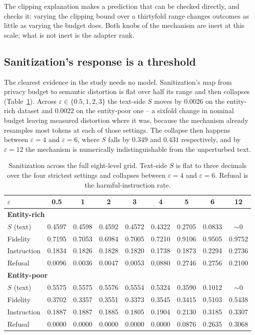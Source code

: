The clipping explanation makes a prediction that can be checked directly,
and  checks it:
varying the clipping bound over a thirtyfold range changes outcomes as little as varying the budget does.
Both knobs of the mechanism are inert at this scale;
what is not inert is the adapter rank.

\subsection{\label{apx:cliffdetail}Sanitization's response is a threshold}
The clearest evidence in the study needs no model.
Sanitization's map from privacy budget to semantic distortion is flat over half its range and then collapses (Table~\ref{tab:cliff}).
Across $\varepsilon \in \{0.5, 1, 2, 3\}$ the text-side $S$ moves by $0.0026$ on the entity-rich dataset and $0.0022$ on the entity-poor one -- a sixfold change in nominal budget leaving measured distortion where it was,
because the mechanism already resamples most tokens at each of those settings.
The collapse then happens between $\varepsilon = 4$ and $\varepsilon = 6$,
where $S$ falls by $0.349$ and $0.431$ respectively,
and by $\varepsilon = 12$ the mechanism is numerically indistinguishable from the unperturbed text.

\begin{table}[t]
  \centering
  \caption{Sanitization across the full eight-level grid.
  Text-side $S$ is flat to three decimals over the four strictest settings and collapses between $\varepsilon = 4$ and $\varepsilon = 6$. Refusal is the harmful-instruction rate.}
  \label{tab:cliff}
  \small
  \setlength{\tabcolsep}{4pt}
  \begin{tabular}{lcccccccc}
    \toprule
    $\varepsilon$ & 0.5 & 1 & 2 & 3 & 4 & 5 & 6 & 12 \\
    \midrule
    \multicolumn{9}{l}{\textbf{Entity-rich}} \\
    $S$ (text)            & 0.4597 & 0.4598 & 0.4592 & 0.4572 & 0.4322 & 0.2705 & 0.0833 & $\sim 0$ \\
    Fidelity              & 0.7195 & 0.7053 & 0.6984 & 0.7005 & 0.7210 & 0.9106 & 0.9505 & 0.9752 \\
    Instruction           & 0.1834 & 0.1826 & 0.1828 & 0.1820 & 0.1738 & 0.1873 & 0.2294 & 0.2736 \\
    Refusal               & 0.0096 & 0.0036 & 0.0047 & 0.0053 & 0.0880 & 0.2746 & 0.2756 & 0.2100 \\
    \midrule
    \multicolumn{9}{l}{\textbf{Entity-poor}} \\
    $S$ (text)            & 0.5575 & 0.5575 & 0.5576 & 0.5554 & 0.5324 & 0.3590 & 0.1012 & $\sim 0$ \\
    Fidelity              & 0.3702 & 0.3357 & 0.3551 & 0.3373 & 0.3545 & 0.3415 & 0.5103 & 0.5438 \\
    Instruction           & 0.1887 & 0.1887 & 0.1885 & 0.1805 & 0.1904 & 0.2130 & 0.3185 & 0.3307 \\
    Refusal               & 0.0000 & 0.0000 & 0.0000 & 0.0000 & 0.0000 & 0.0876 & 0.2635 & 0.3068 \\
    \bottomrule
  \end{tabular}
\end{table}

